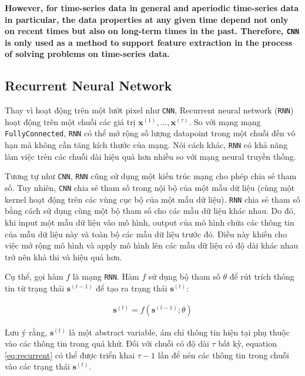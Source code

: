 \textbf{However, for time-series data in general and aperiodic time-series data in particular, the data properties at any given time depend not only on recent times but also on long-term times in the past. Therefore, \Verb|CNN| is only used as a method to support feature extraction in the process of solving problems on time-series data.}


\subsection{Recurrent Neural Network}

Thay vì hoạt động trên một lướt pixel như \verb|CNN|, Recurrent neural network (\verb|RNN|) \cite{rumelhart1986learning} hoạt động trên một chuỗi các giá trị $\mathbf{x}^{(1)},\dots,\mathbf{x}^{(\tau)}$. So với mạng mạng \verb|FullyConnected|, \verb|RNN| có thể mở rộng số lượng datapoint trong một chuỗi đến vô hạn mà không cần tăng kích thước của mạng. Nói cách khác, \verb|RNN| có khả năng làm việc trên các chuỗi dài hiệu quả hơn nhiều so với mạng neural truyền thống.

Tương tự như \verb|CNN|, \verb|RNN| cũng sử dụng một kiến trúc mạng cho phép chia sẻ tham số. Tuy nhiên, \verb|CNN| chia sẻ tham số trong nội bộ của một mẫu dữ liệu (cùng một kernel hoạt động trên các vùng cục bộ của một mẫu dữ liệu). \verb|RNN| chia sẻ tham số bằng cách sử dụng cùng một bộ tham số cho các mẫu dữ liệu khác nhau. Do đó, khi input một mẫu dữ liệu vào mô hình, output của mô hình chứa các thông tin của mẫu dữ liệu này và toàn bộ các mẫu dữ liệu trước đó. Điều này khiến cho việc mở rộng mô hình và apply mô hình lên các mẫu dữ liệu có độ dài khác nhau trở nên khả thi và hiệu quả hơn.

Cụ thể, gọi hàm $f$ là mạng \verb|RNN|. Hàm $f$ sử dụng bộ tham số $\theta$ để rút trích thông tin từ trạng thái $\mathbf{s}^{(t-1)}$ để tạo ra trạng thái $\mathbf{s}^{(t)}$:

\begin{align}
    \mathbf{s}^{(t)} = f\left( \mathbf{s}^{(t-1)}; \theta \right)
    \label{eq:recurrent}
\end{align}

Lưu ý rằng, $\mathbf{s}^{(t)}$ là một abstract variable, ám chỉ thông tin hiện tại phụ thuộc vào các thông tin trong quá khứ. Đối với chuỗi có độ dài $\tau$ bất kỳ, equation \ref{eq:recurrent} có thể được triển khai $\tau-1$ lần để nén các thông tin trong chuỗi vào các trạng thái $\mathbf{s}^{(t)}$.

